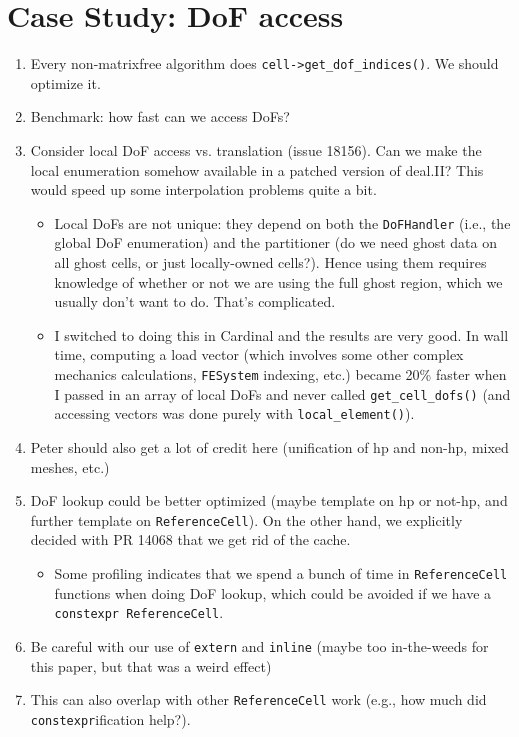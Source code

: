 \documentclass[11pt]{article}
\begin{document}
\section{Case Study: DoF access}
\begin{enumerate}
  \item Every non-matrixfree algorithm does \texttt{cell->get\_dof\_indices()}.
    We should optimize it.

  \item Benchmark: how fast can we access DoFs?

  \item Consider local DoF access vs. translation (issue 18156). Can we make the
    local enumeration somehow available in a patched version of deal.II? This
    would speed up some interpolation problems quite a bit.

    \begin{itemize}
      \item Local DoFs are not unique: they depend on both the
        \texttt{DoFHandler} (i.e., the global DoF enumeration) and the
        partitioner (do we need ghost data on all ghost cells, or just
        locally-owned cells?). Hence using them requires knowledge of whether or
        not we are using the full ghost region, which we usually don't want to
        do. That's complicated.

      \item I switched to doing this in Cardinal and the results are very good.
        In wall time, computing a load vector (which involves some other complex
        mechanics calculations, \texttt{FESystem} indexing, etc.) became 20\%
        faster when I passed in an array of local DoFs and never called
        \texttt{get\_cell\_dofs()} (and accessing vectors was done purely with
        \texttt{local\_element()}).
    \end{itemize}

  \item Peter should also get a lot of credit here (unification of hp and
    non-hp, mixed meshes, etc.)

  \item DoF lookup could be better optimized (maybe template on hp or not-hp,
    and further template on \texttt{ReferenceCell}). On the other hand, we
    explicitly decided with PR 14068 that we get rid of the cache.

    \begin{itemize}
      \item Some profiling indicates that we spend a bunch of time in
        \texttt{ReferenceCell} functions when doing DoF lookup, which could be
        avoided if we have a \texttt{constexpr ReferenceCell}.
    \end{itemize}

  \item Be careful with our use of \texttt{extern} and \texttt{inline} (maybe
    too in-the-weeds for this paper, but that was a weird effect)

  \item This can also overlap with other \texttt{ReferenceCell} work (e.g., how
    much did \texttt{constexpr}ification help?).
\end{enumerate}

\renewcommand\refname{REFERENCES}


\end{document}
